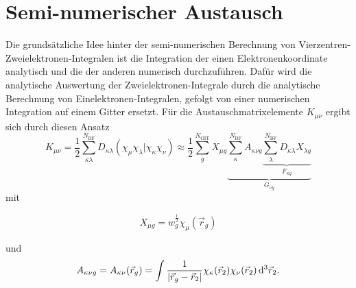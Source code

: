 \section{Semi-numerischer Austausch}
Die grundsätzliche Idee hinter der semi-numerischen Berechnung von Vierzentren-Zweielektronen-Integralen ist die Integration der einen Elektronenkoordinate analytisch und die der anderen numerisch durchzuführen. Dafür wird die analytische Auswertung der Zweielektronen-Integrale durch die analytische Berechnung von Einelektronen-Integralen, gefolgt von einer numerischen Integration auf einem Gitter ersetzt.\supercite{plessow2012seminumerical} Für die Austauschmatrixelemente $K_{\mu\nu}$ ergibt sich durch diesen Ansatz
	\begin{equation}\label{eq:senex}
	K_{\mu\nu}=\frac{1}{2}\sum_{\kappa\lambda}^{N_{\textrm{BF}}}D_{\kappa\lambda} \left(\chi_\mu\chi_\lambda\vert\chi_\kappa\chi_\nu\right)
	\approx\frac{1}{2}\sum_{g}^{N_{\textrm{GIT}}}X_{\mu g}\underbrace{\sum_\kappa^{N_{\textrm{BF}}}A_{\kappa\nu g}\underbrace{\sum_\lambda^{N_{\textrm{BF}}}D_{\kappa\lambda}X_{\lambda g}}_{F_{\kappa g}}}_{G_{\nu g}}
	\end{equation}
	mit 
	
	\begin{equation}
	X_{\mu g}=w_g^{\frac{1}{2}}\chi_\mu(\vec{r}_g)
	\end{equation}
	
	und
	\begin{equation}
	A_{\kappa\nu g}=A_{\kappa\nu}(\vec{r}_g)=\int \frac{1}{\vert\vec{r}_g-\vec{r}_2\vert}\chi_\kappa(\vec{r}_2)\chi_\nu(\vec{r}_2)\mathop{}\!\mathrm{d^3}\vec{r}_2.
	\end{equation}
	
